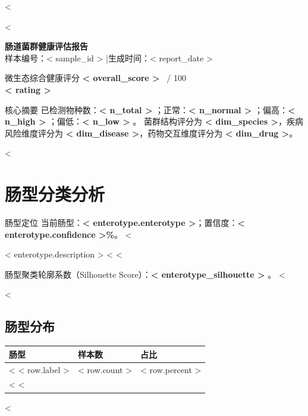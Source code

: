 <%

<%

\thispagestyle{plain}
\begin{center}
  {\sffamily\bfseries\huge\color{WgsBlue} 肠道菌群健康评估报告} \\[0.6em]
  {\color{graytext}\small 样本编号：<{ sample_id }> \quad|\quad 生成时间：<{ report_date }>}
\end{center}

\begin{resultbox}{微生态综合健康评分}
  {\sffamily\bfseries\fontsize{34pt}{38pt}\selectfont\color{WgsBlue} <{ overall_score }>} \, {\large\color{graytext}/ 100} \\[0.5em]
  {\bfseries\color{darkgray} <{ rating }>}
\end{resultbox}

\begin{infobox}{核心摘要}
已检测物种数：\textbf{<{ n_total }> }；正常：\textbf{<{ n_normal }> }；偏高：\textbf{<{ n_high }> }；偏低：\textbf{<{ n_low }> }。
菌群结构评分为 \textbf{<{ dim_species }>}，疾病风险维度评分为 \textbf{<{ dim_disease }>}，药物交互维度评分为 \textbf{<{ dim_drug }>}。
\end{infobox}

\clearpage
\tableofcontents
\clearpage

<%
\section{肠型分类分析}
\begin{infobox}{肠型定位}
当前肠型：\textbf{<{ enterotype.enterotype }>}；置信度：\textbf{<{ enterotype.confidence }>\%}。
<%

<{ enterotype.description }>
<%
<%

肠型聚类轮廓系数（Silhouette Score）：\textbf{<{ enterotype_silhouette }> }。
<%
\end{infobox}

<%
\subsection{肠型分布}
{\footnotesize
\begin{tabularx}{\textwidth}{L{0.38\textwidth} C{0.18\textwidth} Y}
\toprule
{}
\textbf{肠型} & \textbf{样本数} & \textbf{占比} \\
\midrule
<%
<{ row.label }> & <{ row.count }> & <{ row.percent }> \\
<%
<%
\bottomrule
\end{tabularx}
}
<%

